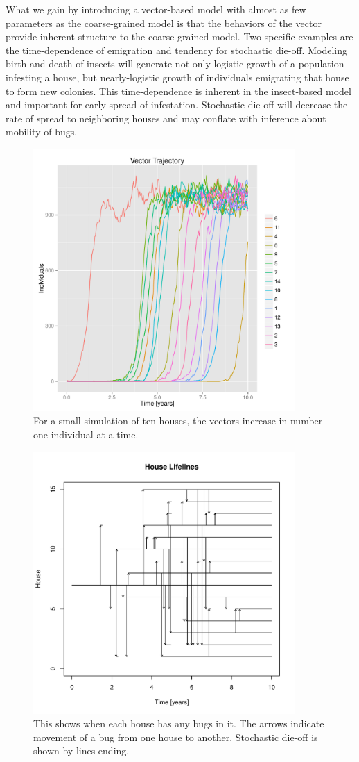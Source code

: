 \documentclass{article}
\begin{document}
What we gain by introducing a vector-based model with
almost as few parameters as the coarse-grained model is
that the behaviors of the vector provide inherent structure
to the coarse-grained model. Two specific examples
are the time-dependence of emigration and tendency for
stochastic die-off. Modeling birth
and death of insects will generate not only logistic
growth of a population infesting a house, but nearly-logistic
growth of individuals emigrating that house to form new
colonies. This time-dependence is inherent in the insect-based
model and important for early spread of infestation.
Stochastic die-off will decrease the rate of spread
to neighboring houses and may conflate with inference
about mobility of bugs.


\begin{figure}
\centerline{\includegraphics[width=10cm]{housecounts.pdf}}
\caption{For a small simulation of ten houses, the vectors increase in number one
individual at a time.\label{fig:housecounts}}
\end{figure}


\begin{figure}
\centerline{\includegraphics[width=10cm]{houselive.pdf}}
\caption{This shows when each house has any bugs in it.
The arrows indicate movement of a bug from one house to another.
Stochastic die-off is shown by lines ending.\label{fig:houselive}}
\end{figure}
\end{document}
